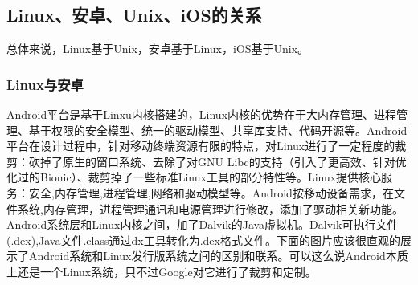 \documentclass{article}
\begin{document}
\subsection{Linux、安卓、Unix、iOS的关系}\par
总体来说，Linux基于Unix，安卓基于Linux，iOS基于Unix。
\subsubsection{Linux与安卓}\par
Android平台是基于Linxu内核搭建的，Linux内核的优势在于大内存管理、进程管理、基于权限的安全模型、统一的驱动模型、共享库支持、代码开源等。Android平台在设计过程中，针对移动终端资源有限的特点，对Linux进行了一定程度的裁剪：砍掉了原生的窗口系统、去除了对GNU Libc的支持（引入了更高效、针对优化过的Bionic）、裁剪掉了一些标准Linux工具的部分特性等。Linux提供核心服务：安全,内存管理,进程管理,网络和驱动模型等。Android按移动设备需求，在文件系统,内存管理，进程管理通讯和电源管理进行修改，添加了驱动相关新功能。Android系统层和Linux内核之间，加了Dalvik的Java虚拟机。Dalvik可执行文件(.dex),Java文件.class通过dx工具转化为.dex格式文件。下面的图片应该很直观的展示了Android系统和Linux发行版系统之间的区别和联系。可以这么说Android本质上还是一个Linux系统，只不过Google对它进行了裁剪和定制。
\end{document}
